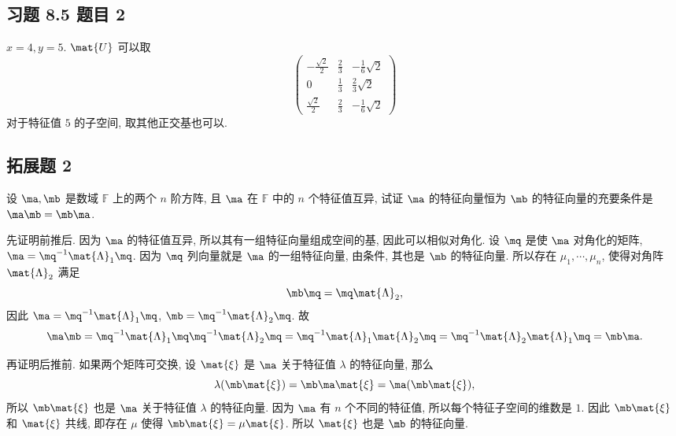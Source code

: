 \subsection*{ 习题 8.5 题目 2 }
\begin{solution}
$x = 4, y = 5$. $\mat{U}$ 可以取
\[
\begin{pmatrix}
    -\frac{\sqrt{2}}{2} & \frac{2}{3} & -\frac{1}{6}\sqrt{2} \\
    0 & \frac{1}{3} & \frac{2}{3}\sqrt{2} \\
    \frac{\sqrt{2}}{2} & \frac{2}{3} & -\frac{1}{6}\sqrt{2}
\end{pmatrix}
\]
对于特征值 $5$ 的子空间, 取其他正交基也可以.
\end{solution}

\newpage
\subsection*{ 拓展题 2 }
\begin{problem*}
设 $\ma, \mb$ 是数域 $\mathbb{F}$ 上的两个 $n$ 阶方阵, 且 $\ma$ 在 $\mathbb{F}$ 中的 $n$ 个特征值互异, 试证 $\ma$ 的特征向量恒为 $\mb$ 的特征向量的充要条件是 $\ma \mb = \mb \ma$.
\end{problem*}
\begin{solution}
先证明前推后. 因为 $\ma$ 的特征值互异, 所以其有一组特征向量组成空间的基, 因此可以相似对角化. 设 $\mq$ 是使 $\ma$ 对角化的矩阵, $\ma = \mq^{-1} \mat{\Lambda}_1 \mq$. 因为 $\mq$ 列向量就是 $\ma$ 的一组特征向量, 由条件, 其也是 $\mb$ 的特征向量. 所以存在 $\mu_1, \cdots, \mu_n$, 使得对角阵 $\mat{\Lambda}_2$ 满足
\[
\mb \mq = \mq \mat{\Lambda}_2,
\]
因此 $\ma = \mq^{-1} \mat{\Lambda}_1 \mq$, $\mb = \mq^{-1} \mat{\Lambda}_2 \mq$. 故
\[
\ma \mb = \mq^{-1} \mat{\Lambda}_1 \mq \mq^{-1} \mat{\Lambda}_2 \mq = \mq^{-1} \mat{\Lambda}_1 \mat{\Lambda}_2 \mq = \mq^{-1} \mat{\Lambda}_2 \mat{\Lambda}_1 \mq = \mb\ma.
\]

再证明后推前. 如果两个矩阵可交换, 设 $\mat{\xi}$ 是 $\ma$ 关于特征值 $\lambda$ 的特征向量, 那么
\[
\lambda(\mb \mat{\xi}) = \mb \ma \mat{\xi} = \ma (\mb \mat{\xi}),
\]
所以 $\mb \mat{\xi}$ 也是 $\ma$ 关于特征值 $\lambda$ 的特征向量. 因为 $\ma$ 有 $n$ 个不同的特征值, 所以每个特征子空间的维数是 $1$. 因此 $\mb \mat{\xi}$ 和 $\mat{\xi}$ 共线, 即存在 $\mu$ 使得 $\mb \mat{\xi} = \mu \mat{\xi}$. 所以 $\mat{\xi}$ 也是 $\mb$ 的特征向量.
\end{solution}

